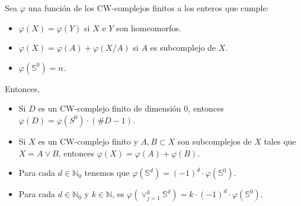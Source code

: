 \documentclass[11pt]{article}
\newcommand{\N}{\mathbb{N}}
\newcommand{\Ss}{\mathbb{S}}
\newcommand{\paint}[1]{\color{color}{#1}}
\newenvironment{lemma}[2][Lema]{\begin{trivlist}
\item[\hskip \labelsep \paint{{\bfseries #1}}\hskip \labelsep {\bfseries #2.}]}{\end{trivlist}}
\begin{document}
\begin{lemma}{1} Sea $\varphi$ una funci\'on de los CW-complejos finitos a los enteros que cumple:
\begin{itemize}
\item[(a)] $\varphi(X) = \varphi(Y)$ si $X$ e $Y$ son homeomorfos.
\item[(b)] $\varphi(X) = \varphi(A) + \varphi(X/A)$ si $A$ es subcomplejo de $X$.
\item[(c)] $\varphi(\Ss^0) = n$.
\end{itemize}
Entonces,
\begin{itemize}
\item[(i)] Si $D$ es un CW-complejo finito de dimensi\'on $0$, entonces $\varphi(D) = \varphi(S^0) \cdot (\#D -1)$.
\item[(ii)] Si $X$ es un CW-complejo finito y $A,B \subset X$ son subcomplejos de $X$ tales que $X = A \vee B$, entonces $\varphi(X) = \varphi(A) + \varphi(B)$.
\item[(iii)] Para cada $d \in \N_0$ tenemos que $\varphi(\Ss^d) = (-1)^d \cdot \varphi(\Ss^0)$.
\item[(iv)] Para cada $d \in \N_0$ y $k \in \N$, es $\varphi(\vee_{j =1}^k\Ss^d) = k \cdot (-1)^d \cdot \varphi(\Ss^0)$.
\end{itemize}
\end{lemma}
\end{document}
